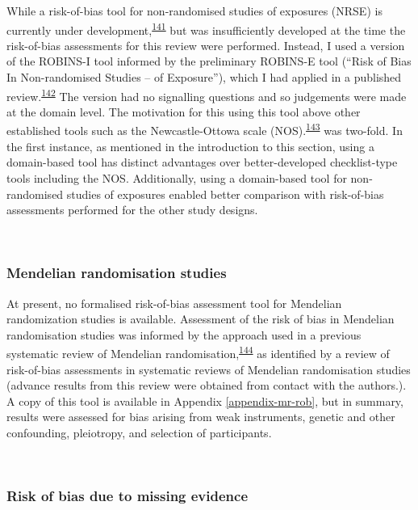 \documentclass[a4paper, twoside]{templates/ociamthesis}
\begin{document}
While a risk-of-bias tool for non-randomised studies of exposures (NRSE) is currently under development,\textsuperscript{\protect\hyperlink{ref-morganr2020}{141}} but was insufficiently developed at the time the risk-of-bias assessments for this review were performed. Instead, I used a version of the ROBINS-I tool informed by the preliminary ROBINS-E tool (``Risk of Bias In Non-randomised Studies -- of Exposure''), which I had applied in a published review.\textsuperscript{\protect\hyperlink{ref-french2019}{142}} The version had no signalling questions and so judgements were made at the domain level. The motivation for this using this tool above other established tools such as the Newcastle-Ottowa scale (NOS).\textsuperscript{\protect\hyperlink{ref-wells2000}{143}} was two-fold. In the first instance, as mentioned in the introduction to this section, using a domain-based tool has distinct advantages over better-developed checklist-type tools including the NOS. Additionally, using a domain-based tool for non-randomised studies of exposures enabled better comparison with risk-of-bias assessments performed for the other study designs.

~

\hypertarget{mendelian-randomisation-studies}{%
\subsubsection{Mendelian randomisation studies}\label{mendelian-randomisation-studies}}

At present, no formalised risk-of-bias assessment tool for Mendelian randomization studies is available. Assessment of the risk of bias in Mendelian randomisation studies was informed by the approach used in a previous systematic review of Mendelian randomisation,\textsuperscript{\protect\hyperlink{ref-mamluk2020}{144}} as identified by a review of risk-of-bias assessments in systematic reviews of Mendelian randomisation studies (advance results from this review were obtained from contact with the authors.). A copy of this tool is available in Appendix \ref{appendix-mr-rob}, but in summary, results were assessed for bias arising from weak instruments, genetic and other confounding, pleiotropy, and selection of participants.

~

\hypertarget{risk-of-bias-due-to-missing-evidence}{%
\subsubsection{Risk of bias due to missing evidence}\label{risk-of-bias-due-to-missing-evidence}}
\end{document}
